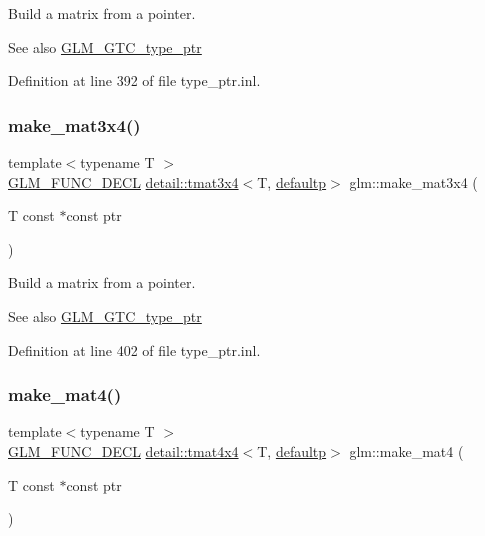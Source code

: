 Build a matrix from a pointer. \begin{DoxySeeAlso}{See also}
\hyperlink{group__gtc__type__ptr}{G\+L\+M\+\_\+\+G\+T\+C\+\_\+type\+\_\+ptr} 
\end{DoxySeeAlso}


Definition at line 392 of file type\+\_\+ptr.\+inl.

\mbox{\label{group__gtc__type__ptr_gaa0c07ac459a5e16374aa12e3b35ee043}} 
\subsubsection{\texorpdfstring{make\+\_\+mat3x4()}{make\_mat3x4()}}
{\footnotesize\ttfamily template$<$typename T $>$ \\
\hyperlink{setup_8hpp_ab2d052de21a70539923e9bcbf6e83a51}{G\+L\+M\+\_\+\+F\+U\+N\+C\+\_\+\+D\+E\+CL} \hyperlink{structglm_1_1detail_1_1tmat3x4}{detail\+::tmat3x4}$<$T, \hyperlink{namespaceglm_a0f04f086094c747d227af4425893f545a9d21ccd8b5a009ec7eb7677befc3bf51}{defaultp}$>$ glm\+::make\+\_\+mat3x4 (\begin{DoxyParamCaption}\item[{T const $\ast$const}]{ptr }\end{DoxyParamCaption})}

Build a matrix from a pointer. \begin{DoxySeeAlso}{See also}
\hyperlink{group__gtc__type__ptr}{G\+L\+M\+\_\+\+G\+T\+C\+\_\+type\+\_\+ptr} 
\end{DoxySeeAlso}


Definition at line 402 of file type\+\_\+ptr.\+inl.

\mbox{\label{group__gtc__type__ptr_gac3920fd61f0c459a4749b8eb9107982c}} 
\subsubsection{\texorpdfstring{make\+\_\+mat4()}{make\_mat4()}}
{\footnotesize\ttfamily template$<$typename T $>$ \\
\hyperlink{setup_8hpp_ab2d052de21a70539923e9bcbf6e83a51}{G\+L\+M\+\_\+\+F\+U\+N\+C\+\_\+\+D\+E\+CL} \hyperlink{structglm_1_1detail_1_1tmat4x4}{detail\+::tmat4x4}$<$T, \hyperlink{namespaceglm_a0f04f086094c747d227af4425893f545a9d21ccd8b5a009ec7eb7677befc3bf51}{defaultp}$>$ glm\+::make\+\_\+mat4 (\begin{DoxyParamCaption}\item[{T const $\ast$const}]{ptr }\end{DoxyParamCaption})}

